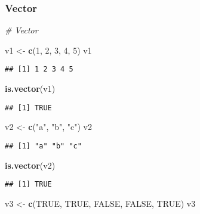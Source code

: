 \documentclass[
]{article}
\newenvironment{Shaded}{\begin{snugshade}}{\end{snugshade}}
\newcommand{\CommentTok}[1]{\textcolor[rgb]{0.56,0.35,0.01}{\textit{#1}}}
\newcommand{\ConstantTok}[1]{\textcolor[rgb]{0.56,0.35,0.01}{#1}}
\newcommand{\DecValTok}[1]{\textcolor[rgb]{0.00,0.00,0.81}{#1}}
\newcommand{\FunctionTok}[1]{\textcolor[rgb]{0.13,0.29,0.53}{\textbf{#1}}}
\newcommand{\NormalTok}[1]{#1}
\newcommand{\OtherTok}[1]{\textcolor[rgb]{0.56,0.35,0.01}{#1}}
\newcommand{\StringTok}[1]{\textcolor[rgb]{0.31,0.60,0.02}{#1}}
\begin{document}
\subsubsection{Vector}\label{vector}

\begin{Shaded}
\begin{Highlighting}[]
\CommentTok{\# Vector}

\NormalTok{v1 }\OtherTok{\textless{}{-}} \FunctionTok{c}\NormalTok{(}\DecValTok{1}\NormalTok{, }\DecValTok{2}\NormalTok{, }\DecValTok{3}\NormalTok{, }\DecValTok{4}\NormalTok{, }\DecValTok{5}\NormalTok{)}
\NormalTok{v1}
\end{Highlighting}
\end{Shaded}

\begin{verbatim}
## [1] 1 2 3 4 5
\end{verbatim}

\begin{Shaded}
\begin{Highlighting}[]
\FunctionTok{is.vector}\NormalTok{(v1)}
\end{Highlighting}
\end{Shaded}

\begin{verbatim}
## [1] TRUE
\end{verbatim}

\begin{Shaded}
\begin{Highlighting}[]
\NormalTok{v2 }\OtherTok{\textless{}{-}} \FunctionTok{c}\NormalTok{(}\StringTok{"a"}\NormalTok{, }\StringTok{"b"}\NormalTok{, }\StringTok{"c"}\NormalTok{)}
\NormalTok{v2}
\end{Highlighting}
\end{Shaded}

\begin{verbatim}
## [1] "a" "b" "c"
\end{verbatim}

\begin{Shaded}
\begin{Highlighting}[]
\FunctionTok{is.vector}\NormalTok{(v2)}
\end{Highlighting}
\end{Shaded}

\begin{verbatim}
## [1] TRUE
\end{verbatim}

\begin{Shaded}
\begin{Highlighting}[]
\NormalTok{v3 }\OtherTok{\textless{}{-}} \FunctionTok{c}\NormalTok{(}\ConstantTok{TRUE}\NormalTok{, }\ConstantTok{TRUE}\NormalTok{, }\ConstantTok{FALSE}\NormalTok{, }\ConstantTok{FALSE}\NormalTok{, }\ConstantTok{TRUE}\NormalTok{)}
\NormalTok{v3}
\end{Highlighting}
\end{Shaded}
\end{document}
